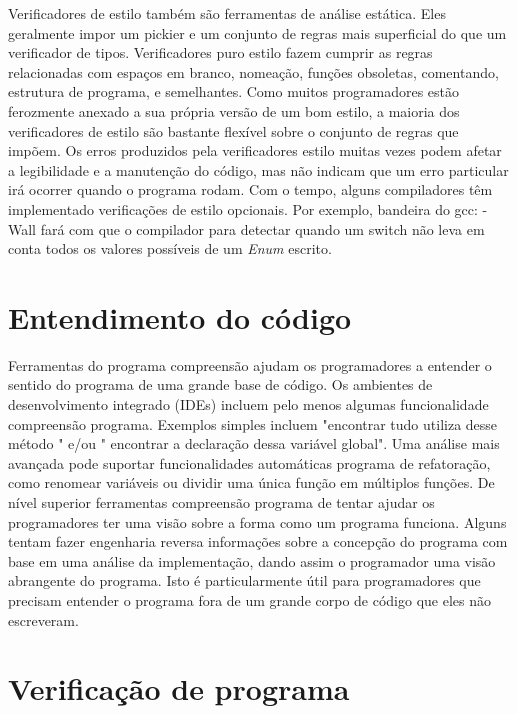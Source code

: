 	Verificadores de estilo também são ferramentas de análise estática. Eles geralmente impor um pickier e um conjunto de regras mais superficial do que um verificador de tipos. Verificadores puro estilo fazem cumprir as regras relacionadas com espaços em branco, nomeação, funções obsoletas, comentando, estrutura de programa, e semelhantes. Como muitos programadores estão ferozmente anexado a sua própria versão de um bom estilo, a maioria dos verificadores de estilo são bastante flexível sobre o conjunto de regras que impõem. Os erros produzidos pela verificadores estilo muitas vezes podem afetar a legibilidade e a manutenção do código, mas não indicam que um erro particular irá ocorrer quando o programa rodam. Com o tempo, alguns compiladores têm implementado verificações de estilo opcionais. Por exemplo, bandeira do gcc: -Wall fará com que o compilador para detectar quando um switch não leva em conta todos os valores possíveis de um {\it Enum} escrito.\\
	
	\section {Entendimento do código}
	
	Ferramentas do programa compreensão ajudam os programadores a entender o sentido  do programa de uma grande base de código. Os ambientes de desenvolvimento integrado (IDEs) incluem pelo menos algumas funcionalidade compreensão programa. Exemplos simples incluem "encontrar tudo utiliza desse método " e/ou " encontrar a declaração dessa variável global". Uma análise mais avançada pode suportar funcionalidades automáticas programa de refatoração, como renomear variáveis ou dividir uma única função em múltiplos funções. De nível superior ferramentas compreensão programa de tentar ajudar os programadores ter uma visão sobre a forma como um programa funciona. Alguns tentam fazer engenharia reversa informações sobre a concepção do programa com base em uma análise da implementação, dando assim o programador uma visão abrangente do programa. Isto é particularmente útil para programadores que precisam entender o programa fora de um grande corpo de código que eles não escreveram.\\
	
	\section {Verificação de programa}
	
